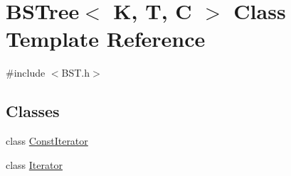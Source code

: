 \hypertarget{class_b_s_tree}{}\section{B\+S\+Tree$<$ K, T, C $>$ Class Template Reference}
\label{class_b_s_tree}


{\ttfamily \#include $<$B\+S\+T.\+h$>$}

\subsection*{Classes}
\begin{DoxyCompactItemize}
\item 
class \hyperlink{class_b_s_tree_1_1_const_iterator}{Const\+Iterator}
\item 
class \hyperlink{class_b_s_tree_1_1_iterator}{Iterator}
\end{DoxyCompactItemize}
